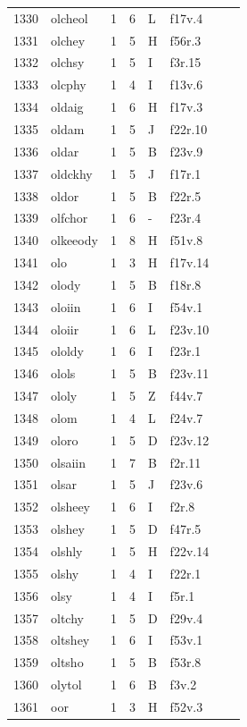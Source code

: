 \documentclass[11pt,a4paper]{article}
\begin{document}
\begin{landscape}
\begin{longtable}{@{}r>{\ttfamily}lrrl>{\ttfamily}l>{\raggedright\arraybackslash}p{80mm}>{\raggedright\arraybackslash}p{36mm}@{}}
1330 & olcheol & 1 & 6 & L & f17v.4 &  & \\
1331 & olchey & 1 & 5 & H & f56r.3 &  & \\
1332 & olchsy & 1 & 5 & I & f3r.15 &  & \\
1333 & olcphy & 1 & 4 & I & f13v.6 &  & \\
1334 & oldaig & 1 & 6 & H & f17v.3 &  & \\
1335 & oldam & 1 & 5 & J & f22r.10 &  & \\
1336 & oldar & 1 & 5 & B & f23v.9 &  & \\
1337 & oldckhy & 1 & 5 & J & f17r.1 &  & \\
1338 & oldor & 1 & 5 & B & f22r.5 &  & \\
1339 & olfchor & 1 & 6 & - & f23r.4 &  & \\
1340 & olkeeody & 1 & 8 & H & f51v.8 &  & \\
1341 & olo & 1 & 3 & H & f17v.14 &  & \\
1342 & olody & 1 & 5 & B & f18r.8 &  & \\
1343 & oloiin & 1 & 6 & I & f54v.1 &  & \\
1344 & oloiir & 1 & 6 & L & f23v.10 &  & \\
1345 & ololdy & 1 & 6 & I & f23r.1 &  & \\
1346 & olols & 1 & 5 & B & f23v.11 &  & \\
1347 & ololy & 1 & 5 & Z & f44v.7 &  & \\
1348 & olom & 1 & 4 & L & f24v.7 &  & \\
1349 & oloro & 1 & 5 & D & f23v.12 &  & \\
1350 & olsaiin & 1 & 7 & B & f2r.11 &  & \\
1351 & olsar & 1 & 5 & J & f23v.6 &  & \\
1352 & olsheey & 1 & 6 & I & f2r.8 &  & \\
1353 & olshey & 1 & 5 & D & f47r.5 &  & \\
1354 & olshly & 1 & 5 & H & f22v.14 &  & \\
1355 & olshy & 1 & 4 & I & f22r.1 &  & \\
1356 & olsy & 1 & 4 & I & f5r.1 &  & \\
1357 & oltchy & 1 & 5 & D & f29v.4 &  & \\
1358 & oltshey & 1 & 6 & I & f53v.1 &  & \\
1359 & oltsho & 1 & 5 & B & f53r.8 &  & \\
1360 & olytol & 1 & 6 & B & f3v.2 &  & \\
1361 & oor & 1 & 3 & H & f52v.3 &  & \\

\end{longtable}
\end{landscape}
\end{document}
